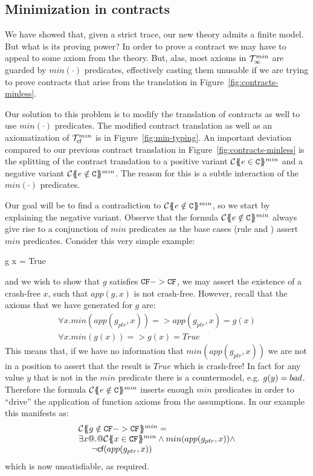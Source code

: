 \subsection{Minimization in contracts}
\newcommand{\ctransmin}[3]{\ctrans{#1}{#2}{#3}^{min}} 
\newcommand{\calI}{{\cal J}}

We have showed that, given a strict trace, our new theory admits a finite model. But what is its proving 
power? In order to prove a contract we may have to appeal to some axiom from the theory. But, alas, most
axioms in ${\cal T}_{\infty}^{min}$ are guarded by $min(\cdot)$ predicates, effectively casting them unusable if we are 
trying to prove contracts that arise from the translation in Figure~\ref{fig:contracts-minless}.

Our solution to this problem is to modify the translation of contracts as well to use $min(\cdot)$ predicates.
The modified contract translation as well as an axiomatization of ${\cal T}_{\textsf{cf}}^{min}$ is in Figure~\ref{fig:min-typing}.
An important deviation compared to our previous contract translation in Figure~\ref{fig:contracts-minless} is the
splitting of the contract translation to a positive variant $\ctransmin{}{\Gamma}{e \in \Ct}$ and a negative 
variant $\ctransmin{}{\Gamma}{e \notin \Ct}$. The reason for this is a subtle interaction of the $min(\cdot)$ 
predicates. 

Our goal will be to find a contradiction to $\ctransmin{}{\Gamma}{e \notin \Ct}$, so we start by explaining
the negative variant. Observe that the formula $\ctransmin{}{\Gamma}{e \notin \Ct}$ 
always give rise to a conjunction of $min$ predicates as the base cases (rule  and )
assert $min$ predicates. Consider this very simple example:
\begin{code}
g x  = True 
\end{code} 
and we wish to show that $g$ satisfies ${\tt CF} -> {\tt CF}$, we may assert the existence of a crash-free $x$, such that 
$app(g,x)$ is not crash-free. However, recall that the axioms that we have generated for $g$ are: 
\[\begin{array}{l} 
   \forall x. min(app(g_{ptr},x)) => app(g_{ptr},x) = g(x) \\ 
   \forall x. min(g(x)) => g(x) = True
\end{array}\] 
This means that, if we have no information that $min(app(g_{ptr},x))$ we are not in a position 
to assert that the result is $True$ which is crash-free! In fact for any value $y$ that is not 
in the $min$ predicate there is a countermodel, e.g. $g(y) = \mathop{bad}$. Therefore the formula 
$\ctransmin{}{\Gamma}{e \notin \Ct}$ inserts enough $min$ predicates in order to ``drive'' 
the application of function axioms from the assumptions. In our example this manifests as: 
\[\begin{array}{l} 
   \ctransmin{}{}{g \notin \CF -> \CF} = \\
  \exists x @.@ \ctransmin{}{}{x \in \CF} \land min(app(g_{ptr},x)) \land \\ 
  \quad\;\; \neg\lcf{app(g_{ptr},x)}
\end{array}\] 
which is now unsatisfiable, as required. 

